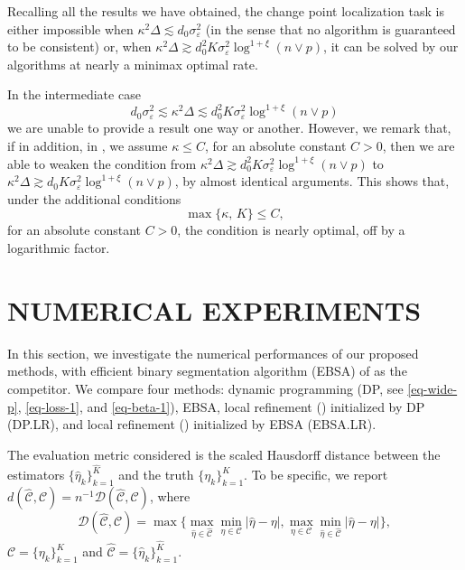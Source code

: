 \documentclass[twoside]{article}
\begin{document}
Recalling all the results we have obtained, the change point localization task is either impossible when $\kappa^2 \Delta \lesssim d_0 \sigma^2_{\varepsilon}$ (in the sense that  no algorithm is guaranteed to be consistent) or, when $\kappa^2 \Delta \gtrsim d_0^2 K \sigma^2_{\varepsilon} \log^{1+\xi}(n \vee p)$, it can be solved by our algorithms at nearly a minimax optimal rate. 

In the intermediate case 
\[
d_0 \sigma^2_{\varepsilon} \lesssim \kappa^2 \Delta \lesssim d^2_0 K \sigma^2_{\varepsilon} \log^{1+\xi}(n \vee p) 
\]
we are unable to provide a result one way or another. 	
However, we remark that, if in addition, in , we assume $\kappa \leq C$, for an absolute constant $C > 0$, then we are able to weaken the condition from $\kappa^2 \Delta \gtrsim d_0^2 K \sigma^2_{\varepsilon} \log^{1+\xi}(n \vee p)$ to $\kappa^2 \Delta \gtrsim d_0 K \sigma^2_{\varepsilon} \log^{1+\xi}(n \vee p)$, by almost identical arguments.  This shows that, under the additional conditions 
	\[
		\max\{\kappa, \, K\} \leq C,
	\]
	for an absolute constant $C > 0$, the condition is nearly optimal, off by a logarithmic factor.  





\section{NUMERICAL EXPERIMENTS}

In this section, we investigate the numerical performances of our proposed methods, with efficient binary segmentation algorithm (EBSA) of \cite{leonardi2016computationally} as the competitor.  We compare four methods: dynamic programming (DP, see \ref{eq-wide-p}, \ref{eq-loss-1}, and \ref{eq-beta-1}), EBSA, local refinement () initialized by DP (DP.LR), and local refinement () initialized by EBSA (EBSA.LR).  

The evaluation metric considered is the scaled Hausdorff distance between the estimators $\{\hat{\eta}_k\}_{k = 1}^{\hat K}$ and the truth $\{\eta_k\}_{k =1}^K$.  To be specific, we report
$\mathit{d}(\hat{\mathcal{C}},\mathcal{C}) = n^{-1}\mathcal{D}(\hat{\mathcal{C}},\mathcal{C})$, where 
    \[
        \mathcal{D}(\hat{\mathcal{C}},\mathcal{C}) = \max\{\max_{\hat{\eta} \in \hat{\mathcal{C}}}\min_{\eta \in \mathcal{C}}|\hat{\eta} - \eta|,\max_{\eta \in \mathcal{C}}\min_{\hat{\eta} \in \hat{\mathcal{C}}}|\hat{\eta} - \eta|\},
    \]
     $\mathcal{C} = \{\eta_k\}_{k =1}^K$ and $\hat{\mathcal{C}} = \{\hat{\eta}_k\}_{k = 1}^{\hat K}$.
\end{document}
